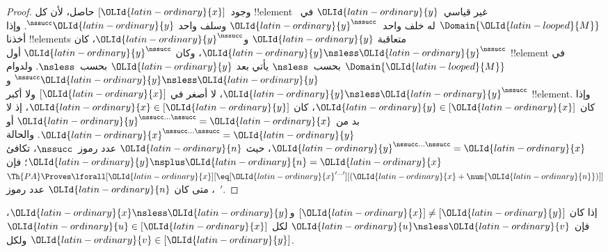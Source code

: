 \documentclass[../../../include/open-logic-section]{subfiles}
\begin{document}
\begin{proof}
وجود~$[\OLId{latin-ordinary}{x}]$ حاصل، لأن كل !!{element} غير قياسي~$\OLId{latin-ordinary}{y}$
في~$\Domain{\OLId{latin-looped}{M}}$ له خلف واحد~$\OLId{latin-ordinary}{y}^\nssucc$ وسلف واحد
$^\nssucc \OLId{latin-ordinary}{y}$. وإذا أخذنا !!{element}s متعاقبة $\OLId{latin-ordinary}{y}$ و$\OLId{latin-ordinary}{y}^\nssucc$،
كان $\OLId{latin-ordinary}{y} \nsless \OLId{latin-ordinary}{y}^\nssucc$، وكان $\OLId{latin-ordinary}{y}^\nssucc$ أول !!{element}
في $\Domain{\OLId{latin-looped}{M}}$ بحسب~$\nsless$ يأتي بعد $\OLId{latin-ordinary}{y}$ بحسب~$\nsless$.
ولدوام $^\nssucc \OLId{latin-ordinary}{y} \nsless \OLId{latin-ordinary}{y}$ و$\OLId{latin-ordinary}{y} \nsless \OLId{latin-ordinary}{y}^\nssucc$،
لا أصغر في $[\OLId{latin-ordinary}{x}]$ ولا أكبر !!{element}. وإذا كان
$\OLId{latin-ordinary}{y} \in [\OLId{latin-ordinary}{x}]$، كان $\OLId{latin-ordinary}{x} \in [\OLId{latin-ordinary}{y}]$، إذ لا بد من
$\OLId{latin-ordinary}{y}^{\nssucc\dots\nssucc} = \OLId{latin-ordinary}{x}$ أو
$\OLId{latin-ordinary}{x}^{\nssucc\dots\nssucc} = \OLId{latin-ordinary}{y}$. والحالة
$\OLId{latin-ordinary}{y}^{\nssucc\dots\nssucc} = \OLId{latin-ordinary}{x}$، حيث $\OLId{latin-ordinary}{n}$ عدد رموز~$\nssucc$،
تكافئ $\OLId{latin-ordinary}{y} \nsplus \OLId{latin-ordinary}{n} = \OLId{latin-ordinary}{x}$؛ فإن
$\Th{PA} \Proves \lforall[\OLId{latin-ordinary}{x}][\eq[\OLId{latin-ordinary}{x}^{\prime\dots\prime}][(\OLId{latin-ordinary}{x} +
    \num{\OLId{latin-ordinary}{n}})]]$، متى كان $\OLId{latin-ordinary}{n}$ عدد رموز~$\prime$.
\end{proof}

\begin{prop}
إذا كان $[\OLId{latin-ordinary}{x}] \neq [\OLId{latin-ordinary}{y}]$ و$\OLId{latin-ordinary}{x} \nsless \OLId{latin-ordinary}{y}$، فإن $\OLId{latin-ordinary}{u} \nsless \OLId{latin-ordinary}{v}$ لكل
$\OLId{latin-ordinary}{u} \in [\OLId{latin-ordinary}{x}]$ ولكل $\OLId{latin-ordinary}{v} \in [\OLId{latin-ordinary}{y}]$.
\end{prop}
\end{document}
